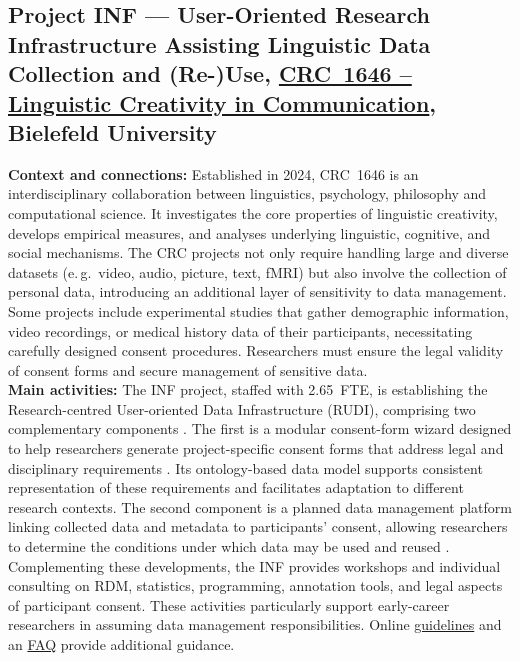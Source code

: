 \documentclass{eceasst}
\newcommand{\eg}{e.\,g.}
\begin{document}
\subsection{Project INF --- User-Oriented Research Infrastructure Assisting Linguistic Data Collection and (Re-)Use, \href{https://gepris.dfg.de/gepris/projekt/512393437?language=en}{CRC~1646 -- Linguistic Creativity in Communication}, Bielefeld University}
\label{subsec:crc1646}
\noindent\textbf{Context and connections:}
Established in 2024, CRC~1646 is an interdisciplinary collaboration between linguistics, psychology, philosophy and computational science. It investigates the core properties of linguistic creativity, develops empirical measures, and analyses underlying linguistic, cognitive, and social mechanisms.
The CRC projects not only require handling large and diverse datasets (\eg~video, audio, picture, text, fMRI) but also involve the collection of personal data, introducing an additional layer of sensitivity to data management. Some projects include experimental studies that gather demographic information, video recordings, or medical history data of their participants, necessitating carefully designed consent procedures. Researchers must ensure the legal \cite{GDPR2016} validity of consent forms and secure management of sensitive data.
\\
\noindent\textbf{Main activities:}
The INF project, staffed with 2.65~FTE, is establishing
the Research-centred User-oriented Data Infrastructure
(RUDI), comprising two complementary components
\cite{JorschickSchrader2024}.
The first is a modular consent-form wizard designed
to help researchers generate project-specific consent forms
that address legal and disciplinary requirements
\cite{StrathmannJoppek2026}.
Its ontology-based data model supports consistent
representation of these requirements and facilitates
adaptation to different research contexts.
The second component is a planned data management
platform linking collected data and metadata to
participants' consent, allowing researchers to determine
the conditions under which data may be used and reused
\cite{Mohammadietal2026}.
Complementing these developments, the INF provides
workshops and individual consulting on RDM, statistics,
programming, annotation tools, and legal aspects of
participant consent. These activities particularly
support early-career researchers in assuming data
management responsibilities.
Online \href{https://purl.org/crc1646/INF/guidelines}
{guidelines} and an \href{https://purl.org/crc1646/INF/FAQ}
{FAQ} provide additional guidance.
\end{document}
